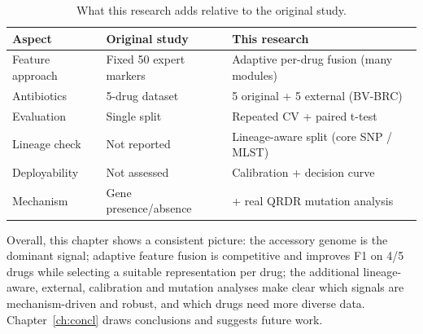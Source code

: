 \documentclass[../main.tex]{subfiles}
\begin{document}
\begin{table}[H]
\centering
\caption{What this research adds relative to the original study.}
\label{tab:cmp}
\begin{tabular}{lll}
\hline
Aspect & Original study & This research \\ \hline
Feature approach & Fixed 50 expert markers & Adaptive per-drug fusion (many modules) \\
Antibiotics & 5-drug dataset & 5 original + 5 external (BV-BRC) \\
Evaluation & Single split & Repeated CV + paired t-test \\
Lineage check & Not reported & Lineage-aware split (core SNP / MLST) \\
Deployability & Not assessed & Calibration + decision curve \\
Mechanism & Gene presence/absence & + real QRDR mutation analysis \\ \hline
\end{tabular}
\end{table}

Overall, this chapter shows a consistent picture: the accessory genome is the dominant signal; adaptive feature fusion is competitive and improves F1 on 4/5 drugs while selecting a suitable representation per drug; the additional lineage-aware, external, calibration and mutation analyses make clear which signals are mechanism-driven and robust, and which drugs need more diverse data. Chapter~\ref{ch:concl} draws conclusions and suggests future work.
\end{document}
